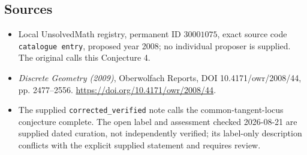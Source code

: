 \documentclass[11pt]{article}
\begin{document}
\subsection{Sources}
\begin{itemize}
\item Local UnsolvedMath registry, permanent ID \(30001075\), exact source code \texttt{catalogue entry}, proposed year 2008; no individual proposer is supplied. The original calls this Conjecture 4.
\item \emph{Discrete Geometry (2009)}, Oberwolfach Reports, DOI 10.4171/owr/2008/44, pp. 2477--2556. \url{https://doi.org/10.4171/owr/2008/44}.
\item The supplied \texttt{corrected\_verified} note calls the common-tangent-locus conjecture complete. The open label and assessment checked 2026-08-21 are supplied dated curation, not independently verified; its label-only description conflicts with the explicit supplied statement and requires review.
\end{itemize}
\end{document}
